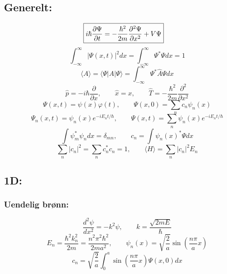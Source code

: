 \documentclass[a4paper,norsk, 10pt]{article}
\begin{document}
\subsection{Generelt:}
\begin{align}
\Aboxed{
i\hbar \frac{\partial \Psi}{\partial t} = -\frac{\hbar^2}{2m}\frac{\partial^2\Psi}{\partial x^2} + V\Psi
}
\end{align}
\begin{equation}
\int_{-\infty}^{\infty}|\Psi(x,t)|^2 dx =\int_{-\infty}^{\infty} \Psi^* \Psi dx = 1 
\end{equation}
\begin{equation}
\langle A \rangle = \langle \Psi|A|\Psi\rangle = \int_{-\infty}^{\infty} \Psi^* \hat{A}\Psi dx
\end{equation}
\begin{equation}
\hat{p} = -i\hbar \frac{\partial}{\partial x}, \qquad \hat{x} = x, \qquad \hat{T} = -\frac{\hbar^2}{2m}\frac{\partial^2}{\partial x^2}
\end{equation}
\begin{equation}
\Psi(x,t) = \psi(x)\varphi(t), \qquad \Psi(x,0) = \sum_n c_n\psi_n(x)
\end{equation}
\begin{equation}
\Psi_n(x,t) = \psi_n(x)e^{-iE_nt/\hbar}, \qquad \Psi(x,t) = \sum_n \psi_n(x)e^{-iE_nt/\hbar}
\end{equation}
\begin{equation}
\int \psi_m^*\psi_n dx = \delta_{mn},\qquad c_n = \int \psi_n(x)^* \Psi dx
\end{equation}
\begin{equation}
\sum_n |c_n|^2 = \sum_n c_n^*c_n = 1, \qquad \langle H \rangle = \sum_n|c_n|^2E_n
\end{equation}

\subsection{1D:}
\subsubsection{Uendelig brønn:}
\begin{equation}
\frac{d^2\psi}{dx^2} = -k^2\psi, \qquad k = \frac{\sqrt{2mE}}{\hbar}
\end{equation}
\begin{equation}
E_n = \frac{\hbar^2k_n^2}{2m} = \frac{n^2\pi^2\hbar^2}{2ma^2},\qquad \psi_n(x) = \sqrt{\frac{2}{a}}\sin\left(\frac{n\pi}{a}x\right)
\end{equation}
\begin{equation}
c_n = \sqrt{\frac{2}{a}}\int_0^a\sin\left(\frac{n\pi}{a}x\right)\Psi(x,0)dx
\end{equation}
\end{document}
